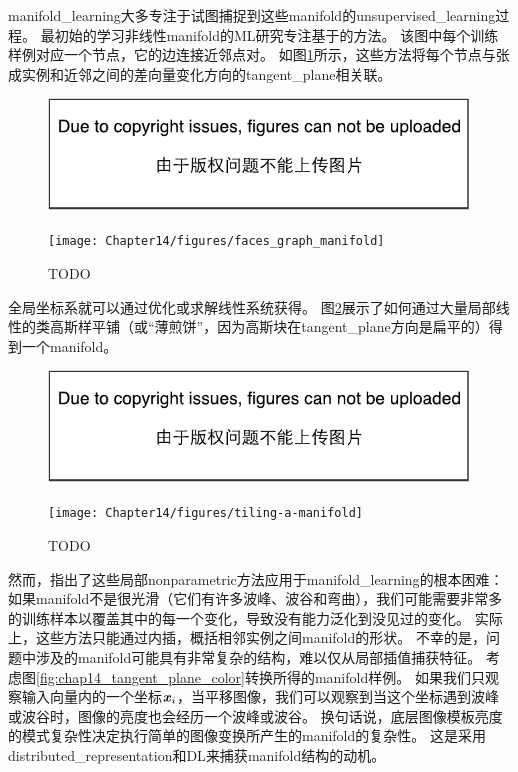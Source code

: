 \gls{manifold_learning}大多专注于试图捕捉到这些\gls{manifold}的\gls{unsupervised_learning}过程。
最初始的学习非线性\gls{manifold}的\gls{ML}研究专注基于的方法。
该图中每个训练样例对应一个节点，它的边连接近邻点对。
如图\ref{fig:chap14_faces_graph_manifold}所示，这些方法\citep{Scholkopf98,Roweis2000-lle-small,Tenenbaum2000-isomap,Brand2003-small,Belkin+Niyogi-2003,Donoho+Carrie-03,Weinberger04a-small,SNE-nips15-small,VanDerMaaten08-small}将每个节点与张成实例和近邻之间的差向量变化方向的\gls{tangent_plane}相关联。

\begin{figure}[!htb]
\ifOpenSource
\centerline{\includegraphics{figure.pdf}}
\else
\centerline{\texttt{[image: Chapter14/figures/faces\_graph\_manifold]}}
\fi
\caption{TODO}
\label{fig:chap14_faces_graph_manifold}
\end{figure}

全局坐标系就可以通过优化或求解线性系统获得。
图\ref{fig:chap14_tiling-a-manifold}展示了如何通过大量局部线性的类高斯样平铺（或``薄煎饼''，因为高斯块在\gls{tangent_plane}方向是扁平的）得到一个\gls{manifold}。

\begin{figure}[!htb]
\ifOpenSource
\centerline{\includegraphics{figure.pdf}}
\else
\centerline{\texttt{[image: Chapter14/figures/tiling-a-manifold]}}
\fi
\caption{TODO}
\label{fig:chap14_tiling-a-manifold}
\end{figure}

然而，\citet{Bengio+Monperrus-2005}指出了这些局部\gls{nonparametric}方法应用于\gls{manifold_learning}的根本困难：如果\gls{manifold}不是很光滑（它们有许多波峰、波谷和弯曲），我们可能需要非常多的训练样本以覆盖其中的每一个变化，导致没有能力泛化到没见过的变化。
实际上，这些方法只能通过内插，概括相邻实例之间\gls{manifold}的形状。
不幸的是，问题中涉及的\gls{manifold}可能具有非常复杂的结构，难以仅从局部插值捕获特征。
考虑图\ref{fig:chap14_tangent_plane_color}转换所得的\gls{manifold}样例。
如果我们只观察输入向量内的一个坐标$\boldsymbol{\mathit{x}}_i$，当平移图像，我们可以观察到当这个坐标遇到波峰或波谷时，图像的亮度也会经历一个波峰或波谷。
换句话说，底层图像模板亮度的模式复杂性决定执行简单的图像变换所产生的\gls{manifold}的复杂性。
这是采用\gls{distributed_representation}和\gls{DL}来捕获\gls{manifold}结构的动机。

